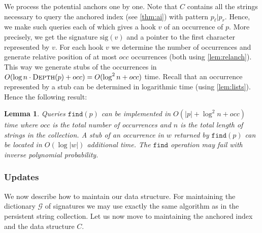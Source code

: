 \documentclass[a4paper]{article}
\newtheorem{lemma}[theorem]{Lemma}
\theoremstyle{remark}
\newcommand{\findop}{\mathtt{find}}
\newcommand{\depth}{\textsc{Depth}}
\newcommand{\grammar}{\mathcal{G}}
\newcommand{\ussig}{\mathrm{sig}}
\begin{document}
We process the potential anchors one by one.
Note that $C$ contains all the strings necessary to query the anchored index (see \cref{thm:ai}) with pattern $p_\ell|p_r$.
Hence, we make such queries each of which gives a hook $v$ of an occurrence of $p$.
More precisely, we get the signature $\ussig(v)$ and a pointer to the first character represented by $v$.
For each hook $v$ we determine the number of occurrences and generate relative position of at most $occ$ occurrences (both using \cref{lem:relanch}).
This way we generate stubs of the occurrences in $O(\log n \cdot \depth(p)+occ)=O(\log^2 n + occ)$ time.
Recall that an occurrence represented by a stub can be determined in logarithmic time (using \cref{lem:lists}).
Hence the following result:
\begin{lemma}\label{lem:findop}
Queries $\findop(p)$ can be implemented in $O(|p|+\log^2 n + occ)$ time where $occ$ is the total number of occurrences and $n$ is the total length of strings in the collection.
A stub of an occurrence in $w$ returned by $\findop(p)$ can be located in $O(\log |w|)$ additional time.
The $\findop$ operation may fail with inverse polynomial probability.
\end{lemma}

\subsubsection{Updates}
We now describe how to maintain our data structure.
For maintaining the dictionary $\grammar$ of signatures we may use exactly the same algorithm as in the persistent string collection.
Let us now move to maintaining the anchored index and the data structure $C$.
\end{document}
